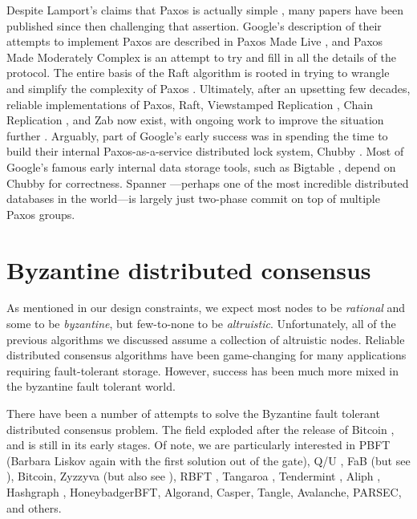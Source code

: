 \documentclass[8pt,fleqn,openany]{book}
\begin{document}
Despite Lamport's claims that Paxos is actually simple \cite{paxos-simple},
many papers have been published since then
challenging that assertion. Google's description of their attempts to implement
Paxos are described in Paxos Made Live \cite{paxos-live},
and Paxos Made Moderately
Complex \cite{paxos-complex} is an attempt to try and fill in all the details of
the protocol. The entire basis of the Raft algorithm is rooted in trying to
wrangle and simplify the complexity of Paxos \cite{raft}. Ultimately, after an
upsetting few decades, reliable implementations of Paxos, Raft, Viewstamped
Replication \cite{vrr}, Chain Replication \cite{chain-rep}, and Zab \cite{zab}
now exist, with ongoing work to improve the situation
further \cite{epaxos,paxos-flexible}. Arguably, part of Google's early success
was in spending the time to build their internal Paxos-as-a-service distributed
lock system, Chubby \cite{chubby}. Most of Google's famous early internal data
storage tools, such as Bigtable \cite{bigtable}, depend on Chubby for
correctness. Spanner \cite{spanner}---perhaps one of the most incredible
distributed databases in the world---is largely just two-phase commit on top of
multiple Paxos groups.

\section{Byzantine distributed consensus}

As mentioned in our design constraints, we expect most nodes to be {\em
rational} and some to be {\em byzantine}, but few-to-none to be {\em
altruistic}. Unfortunately, all of the previous algorithms we discussed assume a
collection of altruistic nodes.
Reliable distributed consensus algorithms have been game-changing for many
applications requiring fault-tolerant storage. However, success has been much
more mixed in the byzantine fault tolerant world.

There have been a number of attempts to solve the Byzantine fault tolerant
distributed consensus problem. The field exploded after the release of Bitcoin
\cite{bitcoin}, and is still in its early stages. Of note, we are particularly
interested in PBFT \cite{pbft} (Barbara Liskov again with the
first solution out of the gate), Q/U \cite{qu}, FaB \cite{fab} (but see
\cite{fab-revisited}), Bitcoin, Zyzzyva \cite{zyzzyva} (but also
see \cite{fab-revisited}), RBFT \cite{rbft}, Tangaroa \cite{tangaroa},
Tendermint \cite{tendermint}, Aliph \cite{aliph}, Hashgraph \cite{hashgraph},
HoneybadgerBFT\cite{honeybadger}, Algorand\cite{algorand}, Casper\cite{casper},
Tangle\cite{tangle}, Avalanche\cite{avalanche}, PARSEC\cite{parsec}, and
others\cite{mickens-bft}.
\end{document}
